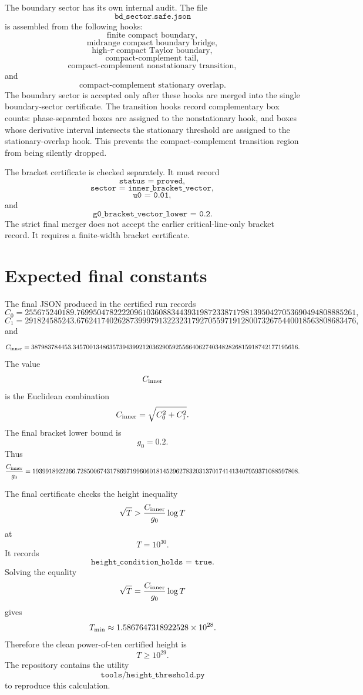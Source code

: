 \documentclass[11pt]{article}
\newcommand{\tauh}{\tau}
\newcommand{\Czero}{C_0}
\newcommand{\Cone}{C_1}
\newcommand{\Cinner}{C_{\rm inner}}
\newcommand{\gzero}{g_0}
\newcommand{\JSON}[1]{\texttt{#1}}
\newcommand{\code}[1]{\texttt{#1}}
\begin{document}
The boundary sector has its own internal audit.  The file
\[
        \code{bd\_sector.safe.json}
\]
is assembled from the following hooks:
\[
        \text{finite compact boundary},
\]
\[
        \text{midrange compact boundary bridge},
\]
\[
        \text{high-\(\tauh\) compact Taylor boundary},
\]
\[
        \text{compact-complement tail},
\]
\[
        \text{compact-complement nonstationary transition},
\]
and
\[
        \text{compact-complement stationary overlap}.
\]
The boundary sector is accepted only after these hooks are merged into the
single boundary-sector certificate.  The transition hooks record complementary
box counts: phase-separated boxes are assigned to the nonstationary hook, and
boxes whose derivative interval intersects the stationary threshold are
assigned to the stationary-overlap hook.  This prevents the compact-complement
transition region from being silently dropped.

The bracket certificate is checked separately.  It must record
\[
        \JSON{status = proved},
\]
\[
        \JSON{sector = inner\_bracket\_vector},
\]
\[
        \JSON{u0 = 0.01},
\]
and
\[
        \JSON{g0\_bracket\_vector\_lower = 0.2}.
\]
The strict final merger does not accept the earlier critical-line-only bracket
record.  It requires a finite-width bracket certificate.

\section{Expected final constants}

The final JSON produced in the certified run records
\[
        \Czero
        =
        255675240189.76995047822220961036088344393198723387179813950427053690494808885261,
\]
\[
        \Cone
        =
        291824585243.67624174026287399979132232317927055971912800732675440018563808683476,
\]
and
\[
        \Cinner
        =
        387983784453.34570013486357394399212036290592556640627403482826815918742177195616.
\]
The value
\[
        \Cinner
\]
is the Euclidean combination
\[
        \Cinner
        =
        \sqrt{\Czero^2+\Cone^2}.
\]
The final bracket lower bound is
\[
        \gzero=0.2.
\]
Thus
\[
        \frac{\Cinner}{\gzero}
        =
        1939918922266.7285006743178697199606018145296278320313701741413407959371088597808.
\]

The final certificate checks the height inequality
\[
        \sqrt T>
        \frac{\Cinner}{\gzero}\log T
\]
at
\[
        T=10^{30}.
\]
It records
\[
        \JSON{height\_condition\_holds = true}.
\]
Solving the equality
\[
        \sqrt T=
        \frac{\Cinner}{\gzero}\log T
\]
gives
\[
        T_{\rm min}
        \approx
        1.5867647318922528\times10^{28}.
\]
Therefore the clean power-of-ten certified height is
\[
        T\ge10^{29}.
\]
The repository contains the utility
\[
        \code{tools/height\_threshold.py}
\]
to reproduce this calculation.
\end{document}
